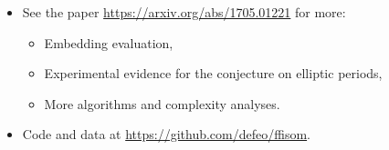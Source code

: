 \documentclass[20pt,a0paper,blockverticalspace=10mm]{tikzposter}
\begin{document}
\begin{columns}
{    \begin{itemize}
    \item See the paper \url{https://arxiv.org/abs/1705.01221} for more:
      \begin{itemize}
      \item Embedding evaluation,
      \item Experimental evidence for the conjecture on elliptic periods,
      \item More algorithms and complexity analyses.
      \end{itemize}
    \item Code and data at \url{https://github.com/defeo/ffisom}.
    \end{itemize}
  }


\end{columns}
\end{document}
